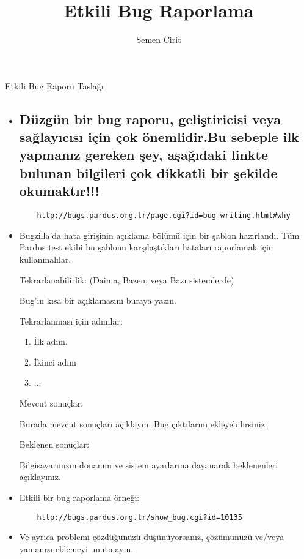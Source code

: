 \documentclass[a4paper,10pt]{article}
\title{Etkili Bug Raporlama}
\author{Semen Cirit}
\begin{document}
\maketitle

Etkili Bug Raporu Taslağı

\begin{itemize}
 
  	\item \subsection*{Düzgün bir  bug raporu, geliştiricisi veya sağlayıcısı için çok önemlidir.Bu sebeple ilk yapmanız gereken şey, aşağıdaki linkte bulunan bilgileri çok dikkatli bir şekilde okumaktır!!!}
	\begin{verbatim} 
 	http://bugs.pardus.org.tr/page.cgi?id=bug-writing.html#why
	\end{verbatim}


  	\item Bugzilla'da hata girişinin açıklama bölümü için bir şablon hazırlandı. Tüm Pardus test ekibi bu şablonu karşılaştıkları hataları raporlamak için kullanmalılar.

   	Tekrarlanabilirlik: (Daima, Bazen, veya Bazı sistemlerde)	
   
    	Bug'ın kısa bir açıklamasını buraya yazın.
   
   	Tekrarlanması için adımlar:
   	\begin{enumerate}
    	\item İlk adım.
    	\item İkinci adım
    	\item ...
   	\end{enumerate}

	Mevcut sonuçlar:

	Burada mevcut sonuçları açıklayın. Bug çıktılarını ekleyebilirsiniz.
	
	Beklenen sonuçlar:

	Bilgisayarınızın donanım ve sistem ayarlarına dayanarak beklenenleri açıklayınız.
	
	\item Etkili bir bug raporlama örneği:
	\begin{verbatim}
	http://bugs.pardus.org.tr/show_bug.cgi?id=10135
	\end{verbatim}
	\item Ve ayrıca problemi çözdüğünüzü düşünüyorsanız, çözümünüzü ve/veya yamanızı eklemeyi unutmayın.


\end{itemize}
\end{document}
